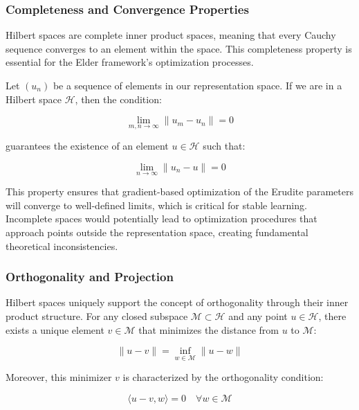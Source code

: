 \subsubsection{Completeness and Convergence Properties}

Hilbert spaces are complete inner product spaces, meaning that every Cauchy sequence converges to an element within the space. This completeness property is essential for the Elder framework's optimization processes.

Let $(u_n)$ be a sequence of elements in our representation space. If we are in a Hilbert space $\mathcal{H}$, then the condition:

\begin{equation}
\lim_{m,n \to \infty} \|u_m - u_n\| = 0
\end{equation}

guarantees the existence of an element $u \in \mathcal{H}$ such that:

\begin{equation}
\lim_{n \to \infty} \|u_n - u\| = 0
\end{equation}

This property ensures that gradient-based optimization of the Erudite parameters will converge to well-defined limits, which is critical for stable learning. Incomplete spaces would potentially lead to optimization procedures that approach points outside the representation space, creating fundamental theoretical inconsistencies.

\subsubsection{Orthogonality and Projection}

Hilbert spaces uniquely support the concept of orthogonality through their inner product structure. For any closed subspace $\mathcal{M} \subset \mathcal{H}$ and any point $u \in \mathcal{H}$, there exists a unique element $v \in \mathcal{M}$ that minimizes the distance from $u$ to $\mathcal{M}$:

\begin{equation}
\|u - v\| = \inf_{w \in \mathcal{M}} \|u - w\|
\end{equation}

Moreover, this minimizer $v$ is characterized by the orthogonality condition:

\begin{equation}
\langle u - v, w \rangle = 0 \quad \forall w \in \mathcal{M}
\end{equation}


